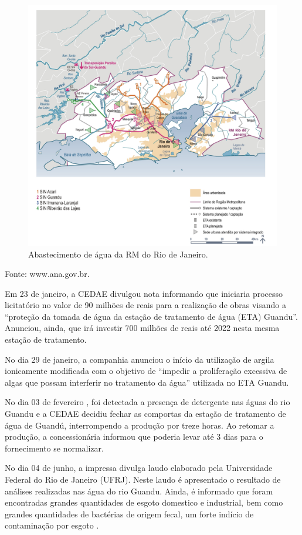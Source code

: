 \documentclass[
  12pt,
]{book}
\begin{document}
\begin{figure}

{\centering \includegraphics[width=0.8\linewidth]{imagem/abastece} 

}

\caption{Abastecimento de água da RM do Rio de Janeiro.}\label{fig:unnamed-chunk-2}
\end{figure}
\centerline{Fonte: www.ana.gov.br.}

Em 23 de janeiro, a CEDAE divulgou nota informando que iniciaria processo licitatório no valor de 90 milhões de reais para a realização de obras visando a ``proteção da tomada de água da estação de tratamento de água (ETA) Guandu''. Anunciou, ainda, que irá investir 700 milhões de reais até 2022 nesta mesma estação de tratamento.

No dia 29 de janeiro, a companhia anunciou o início da utilização de argila ionicamente modificada com o objetivo de ``impedir a proliferação excessiva de algas que possam interferir no tratamento da água'' utilizada no ETA Guandu.

No dia 03 de fevereiro \citep{Ana-ebc2}, foi detectada a presença de detergente nas águas do rio Guandu e a CEDAE decidiu fechar as comportas da estação de tratamento de água de Guandú, interrompendo a produção por treze horas. Ao retomar a produção, a concessionária informou que poderia levar até 3 dias para o fornecimento se normalizar.

No dia 04 de junho, a impressa divulga laudo elaborado pela Universidade Federal do Rio de Janeiro (UFRJ). Neste laudo é apresentado o resultado de análises realizadas nas água do rio Guandu. Ainda, é informado que foram encontradas grandes quantidades de esgoto domestico e industrial, bem como grandes quantidades de bactérias de origem fecal, um forte indício de contaminação por esgoto \citep{chicor}.
\end{document}
